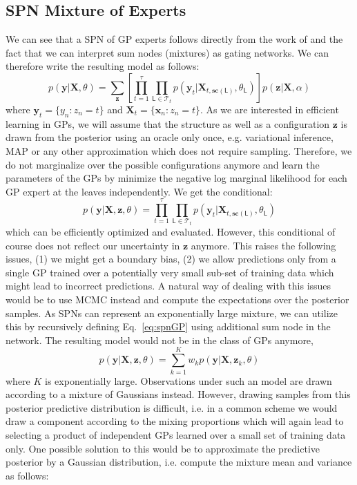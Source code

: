 \documentclass[10pt,letterpaper]{article}
\newcommand{\SPT}{\mathcal{T}}
\newcommand{\X}{\mathbf{X}}
\newcommand{\x}{\mathbf{x}}
\newcommand{\y}{\mathbf{y}}
\newcommand{\z}{\mathbf{z}}
\newcommand{\Leaf}{\mathsf{L}}
\newcommand{\scope}{\ensuremath{\mathbf{sc}}} %
\theoremstyle{mystyle}
\begin{document}
\subsection{SPN Mixture of Experts}
We can see that a SPN of GP experts follows directly from the work of \cite{RasmussenG2001} and the fact that we can interpret sum nodes (mixtures) as gating networks.
We can therefore write the resulting model as follows:
\begin{equation} \label{eq:spnGP}
  p(\y | \X, \theta) = \sum_{\z} \left[ \prod_{t=1}^{\tau} \prod_{\Leaf \in \SPT_{t}} p(\y_t | \X_{t,\scope(\Leaf)}, \theta_{\Leaf}) \right] p(\z | \X, \alpha)
\end{equation}
where $\y_t = \{y_n : z_n = t\}$ and $\X_t = \{\x_n : z_n = t\}$.
As we are interested in efficient learning in GPs, we will assume that the structure as well as a configuration $\z$ is drawn from the posterior using an oracle only once, e.g. variational inference, MAP or any other approximation which does not require sampling.
Therefore, we do not marginalize over the possible configurations anymore and learn the parameters of the GPs by minimize the negative log marginal likelihood for each GP expert at the leaves independently.
We get the conditional:
\[
  p(\y | \X, \z, \theta) = \prod_{t=1}^{\tau} \prod_{\Leaf \in \SPT_{t}} p(\y_t | \X_{t,\scope(\Leaf)}, \theta_{\Leaf})
\]
which can be efficiently optimized and evaluated.
However, this conditional of course does not reflect our uncertainty in $\z$ anymore.
This raises the following issues, (1) we might get a boundary bias, (2) we allow predictions only from a single GP trained over a potentially very small sub-set of training data which might lead to incorrect predictions.
A natural way of dealing with this issues would be to use MCMC instead and compute the expectations over the posterior samples.
As SPNs can represent an exponentially large mixture, we can utilize this by recursively defining Eq.~\ref{eq:spnGP} using additional sum node in the network.
The resulting model would not be in the class of GPs anymore,
\[
  p(\y | \X, \z, \theta) = \sum_{k=1}^K w_k p(\y | \X, \z_k, \theta)
\]
where $K$ is exponentially large. Observations under such an model are drawn according to a mixture of Gaussians instead.
However, drawing samples from this posterior predictive distribution is difficult, i.e. in a common scheme we would draw a component according to the mixing proportions which will again lead to selecting a product of independent GPs learned over a small set of training data only. 
One possible solution to this would be to approximate the predictive posterior by a Gaussian distribution, i.e. compute the mixture mean and variance as follows: 
\end{document}

